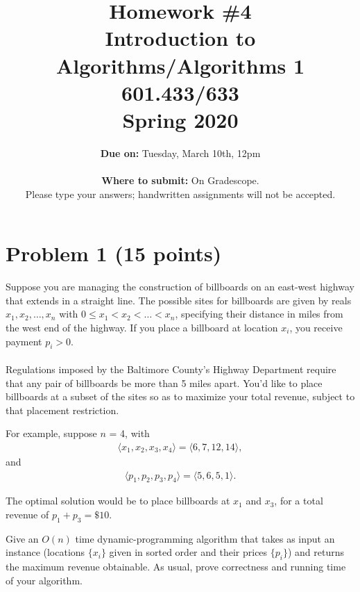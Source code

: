 \documentclass[letterpaper, 11pt]{article}
\begin{document}
\setlength{\parskip}{1em}
\setlength{\parindent}{0em}


\title{Homework \#4 \\ Introduction to Algorithms/Algorithms 1 \\ 601.433/633 \\Spring 2020}
\author{\textbf{Due on:} Tuesday, March 10th, 12pm \\
\\\textbf{Where to submit:} On Gradescope.
\\ Please type your answers; handwritten assignments will not be accepted.}
\date{}

\maketitle


\section{Problem 1 (15 points)}
Suppose you are managing the construction of billboards on an east-west highway that extends in a straight line. The possible sites for billboards are given by reals $x_1, x_2,\dots, x_n$ with $0 \le x_1 < x_2 < \dots < x_n$, specifying their distance in miles from the west end of the highway. If you place a billboard at location $x_i$, you receive payment $p_i > 0$.\\\\
Regulations imposed by the Baltimore County's Highway Department require that any pair of billboards be more than 5 miles apart. You'd like to place billboards at a subset of the sites so as to maximize your total revenue, subject to that placement restriction.

For example, suppose $n$ = 4, with
\begin{align*}
 \langle x_1,x_2,x_3,x_4 \rangle = \langle 6,7,12,14 \rangle,
\end{align*}
and
\begin{align*}
\langle p_1,p_2,p_3,p_4\rangle = \langle 5,6,5,1 \rangle.
\end{align*}

The optimal solution would be to place billboards at $x_1$ and $x_3$, for a total revenue of $p_1 +p_3 = \$10$.

Give an $O(n)$ time dynamic-programming algorithm that takes as input an instance (locations $\{x_i\}$ given in sorted order and their prices $\{p_i\}$) and returns the maximum revenue obtainable. As usual, prove correctness and running time of your algorithm.
\end{document}
